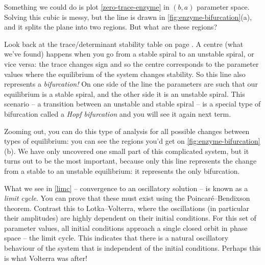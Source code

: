 \documentclass[main.tex]{subfiles}
\begin{document}
Something we could do is plot \cref{zero-trace-enzyme} in $(b,a)$ parameter space. Solving this cubic is messy, but the line is drawn in \cref{fig:enzyme-bifurcation}(a), and it splits the plane into two regions. But what are these regions?

Look back at the trace/determinant stability table on page \pageref{tr-det-table}. A centre (what we've found) happens when you go from a stable spiral to an unstable spiral, or vice versa: the trace changes sign and so the centre corresponds to the parameter values where the equilibrium of the system changes stability. So this line also represents a \emph{bifurcation!} On one side of the line the parameters are such that our equilibrium is a stable spiral, and the other side it is an unstable spiral. This scenario -- a transition between an unstable and stable spiral -- is a special type of bifurcation called a \emph{Hopf bifurcation} and you will see it again next term.

Zooming out, you can do this type of analysis for all possible changes between types of equilibrium: you can see the regions you'd get on \cref{fig:enzyme-bifurcation}(b). We have only uncovered one small part of this complicated system, but it turns out to be the most important, because only this line represents the change from a stable to an unstable equilibrium: it represents the only bifurcation.


\begin{nem}
	What we see in \cref{limc} -- convergence to an oscillatory solution -- is known as a \emph{limit cycle}. You can prove that these must exist using the Poincar\'{e}--Bendixson theorem. Contrast this to Lotka--Volterra, where the oscillations (in particular their amplitudes) are highly dependent on their initial conditions. For this set of parameter values, all initial conditions approach a single closed orbit in phase space -- the limit cycle. This indicates that there is a natural oscillatory behaviour of the system that is independent of the initial conditions. Perhaps this is what Volterra was after!
\end{nem}
\end{document}
